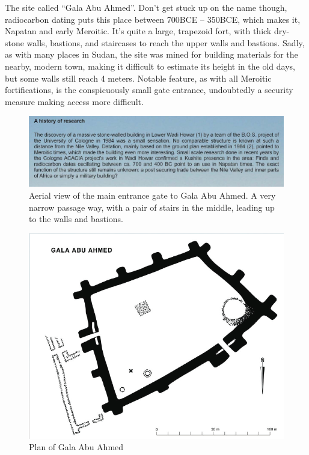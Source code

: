 \documentclass[a4paper,12pt]{scrreprt}
\begin{document}
The site called “Gala Abu Ahmed”. Don’t get stuck up on the name though, radiocarbon dating puts this place between 700BCE – 350BCE, which makes it, Napatan and early Meroitic. It’s quite a large, trapezoid fort, with thick dry-stone walls, bastions, and staircases to reach the upper walls and bastions. Sadly, as with many places in Sudan, the site was mined for building materials for the nearby, modern town, making it difficult to estimate its height in the old days, but some walls still reach 4 meters. Notable feature, as with all Meroitic fortifications, is the conspicuously small gate entrance, undoubtedly a security measure making access more difficult. 


\begin{figure}[H]
	\centering
	\includegraphics[width=\textwidth]{img/fortress/history_of_research}
	\caption{Aerial view of the main entrance gate to Gala Abu Ahmed. A very narrow passage way, with a pair of stairs in the middle, leading up to the walls and bastions.}
\end{figure}

\begin{figure}[H]
	\centering
	\includegraphics[width=\textwidth]{img/fortress/gala_abu_ahmed}
	\caption{Plan of Gala Abu Ahmed}
\end{figure}
\end{document}
